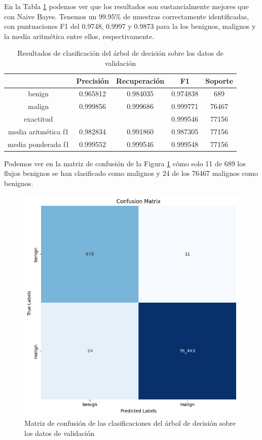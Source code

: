 En la Tabla \ref{table:decisiontreeresults} podemos ver que los resultados son sustancialmente mejores que con Naive Bayes. Tenemos un 99.95\% de muestras correctamente identificadas, con puntuaciones F1 del 0.9748, 0.9997 y 0.9873 para la los benignos, malignos y la media aritmética entre ellos, respectivamente. 

\begin{table}[H]
    \begin{center}
        \begin{tabular}{|c | c c c | c |} 
            \hline
            & \textbf{Precisión} & \textbf{Recuperación} & \textbf{F1}  & \textbf{Soporte} \\
            \hline
            benign               & 0.965812 & 0.984035 & 0.974838  &   689 \\
            malign               & 0.999856 & 0.999686 & 0.999771  & 76467 \\
            \hline
            exactitud            &          &          & 0.999546  & 77156 \\
            media aritmética f1  & 0.982834 & 0.991860 & 0.987305  & 77156 \\
            media ponderada f1   & 0.999552 & 0.999546 & 0.999548  & 77156 \\
            \hline
        \end{tabular}
    \end{center}
    \caption{Resultados de clasificación del árbol de decisión sobre los datos de validación}
    \label{table:decisiontreeresults}
\end{table}

Podemos ver en la matriz de confusión de la Figura \ref{fig:decisiontreematrix} cómo solo 11 de 689 los flujos benignos se han clasificado como malignos y 24 de los 76467 malignos como benignos.

\begin{figure}[H]
    \begin{center}
        \includegraphics[width=0.55\linewidth]{media/packet_pincer_train_models_decision_trees.png}
    \end{center}
    \caption{Matriz de confusión de las clasificaciones del árbol de decisión sobre los datos de validación}\label{fig:decisiontreematrix}
\end{figure}

